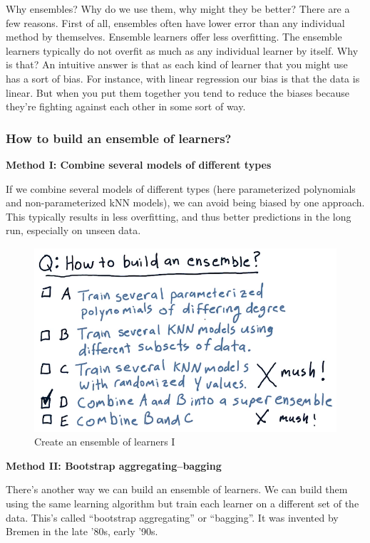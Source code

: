 \documentclass[12pt]{article}
\newcommand{\q}[1]{``#1''}
\begin{document}
Why ensembles? Why do we use them, why might they be better? There are a few reasons. First of all, ensembles often have lower error than any individual method by themselves. Ensemble learners offer less overfitting. The ensemble learners typically do not overfit as much as any individual learner by itself. Why is that? An intuitive answer is that as each kind of learner that you might use has a sort of bias. For instance, with linear regression our bias is that the data is linear. But when you put them together you tend to reduce the biases because they're fighting against each other in some sort of way. 

\subsubsection{How to build an ensemble of learners?}

\noindent
\textbf{Method I: Combine several models of different types} 

If we combine several models of different types (here parameterized polynomials and non-parameterized kNN models), we can avoid being biased by one approach. This typically results in less overfitting, and thus better predictions in the long run, especially on unseen data.

\begin{figure}[!ht]
\centering
\includegraphics[scale=0.45]{fig/fig93}
\caption{Create an ensemble of learners I}
\end{figure}

\noindent
\textbf{Method II: Bootstrap aggregating--bagging}

There's another way we can build an ensemble of learners. We can build them using the same learning algorithm but train each learner on a different set of the data. This's called \q{bootstrap aggregating} or \q{bagging}. It was invented by Bremen in the late '80s, early '90s. 
\end{document}
